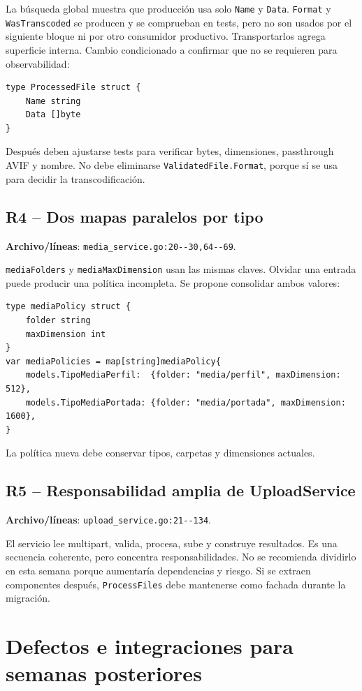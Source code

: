 \documentclass[11pt,a4paper]{article}
\begin{document}
La búsqueda global muestra que producción usa solo \nolinkurl{Name} y \nolinkurl{Data}. \nolinkurl{Format} y \nolinkurl{WasTranscoded} se producen y se comprueban en tests, pero no son usados por el siguiente bloque ni por otro consumidor productivo. Transportarlos agrega superficie interna.
Cambio condicionado a confirmar que no se requieren para observabilidad:
\begin{lstlisting}
type ProcessedFile struct {
    Name string
    Data []byte
}
\end{lstlisting}
Después deben ajustarse tests para verificar bytes, dimensiones, passthrough AVIF y nombre. No debe eliminarse \nolinkurl{ValidatedFile.Format}, porque sí se usa para decidir la transcodificación.

\subsection{R4 -- Dos mapas paralelos por tipo}
\textbf{Archivo/líneas}: \nolinkurl{media_service.go:20--30,64--69}.

\nolinkurl{mediaFolders} y \nolinkurl{mediaMaxDimension} usan las mismas claves. Olvidar una entrada puede producir una política incompleta. Se propone consolidar ambos valores:
\begin{lstlisting}
type mediaPolicy struct {
    folder string
    maxDimension int
}
var mediaPolicies = map[string]mediaPolicy{
    models.TipoMediaPerfil:  {folder: "media/perfil", maxDimension: 512},
    models.TipoMediaPortada: {folder: "media/portada", maxDimension: 1600},
}
\end{lstlisting}
La política nueva debe conservar tipos, carpetas y dimensiones actuales.

\subsection{R5 -- Responsabilidad amplia de UploadService}
\textbf{Archivo/líneas}: \nolinkurl{upload_service.go:21--134}.

El servicio lee multipart, valida, procesa, sube y construye resultados. Es una secuencia coherente, pero concentra responsabilidades. No se recomienda dividirlo en esta semana porque aumentaría dependencias y riesgo. Si se extraen componentes después, \nolinkurl{ProcessFiles} debe mantenerse como fachada durante la migración.

\section{Defectos e integraciones para semanas posteriores}
\end{document}
